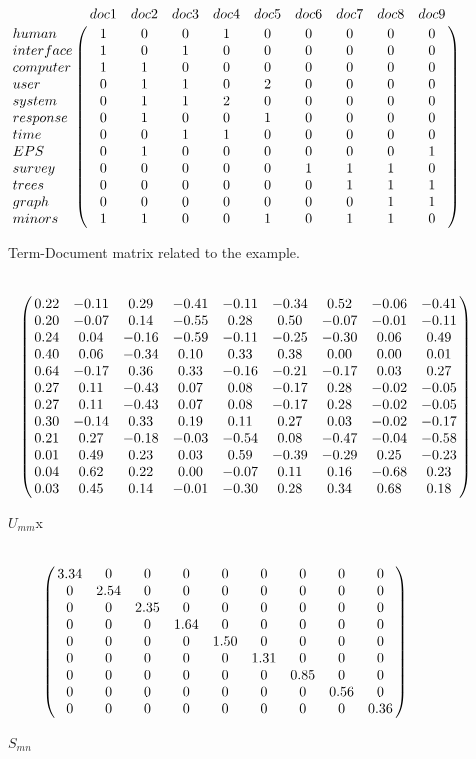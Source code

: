\begin{figure}[h!]
	\begin{equation} \nonumber
	\bordermatrix{~ & doc1 & doc2 & doc3 & doc4 & doc5 & doc6 & doc7 & doc8 & doc9 \cr	
		human	& 1 & 0 & 0 & 1 & 0 & 0 & 0 & 0 & 0 \cr
		interface	& 1 & 0 & 1 & 0 & 0 & 0 & 0 & 0 & 0 \cr
		computer	& 1 & 1 & 0 & 0 & 0 & 0 & 0 & 0 & 0 \cr    
		user 		& 0 & 1 & 1 & 0 & 2 & 0 & 0 & 0 & 0 \cr
		system 	& 0 & 1 & 1 & 2 & 0 & 0 & 0 & 0 & 0 \cr
		response	& 0 & 1 & 0 & 0 & 1 & 0 & 0 & 0 & 0 \cr
		time 		& 0 & 0 & 1 & 1 & 0 & 0 & 0 & 0 & 0 \cr
		EPS 		& 0 & 1 & 0 & 0 & 0 & 0 & 0 & 0 & 1 \cr
		survey	& 0 & 0 & 0 & 0 & 0 & 1 & 1 & 1 & 0 \cr
		trees 		& 0 & 0 & 0 & 0 & 0 & 0 & 1 & 1 & 1 \cr
		graph 		& 0 & 0 & 0 & 0 & 0 & 0 & 0 & 1 & 1 \cr
		minors		& 1 & 1 & 0 & 0 & 1 & 0 & 1 & 1 & 0 \cr	  }
	\end{equation}
	\caption{Term-Document matrix related to the example.}
	\label{fig:TDM}
\end{figure}

\begin{figure}[h!]
	\begin{equation} \nonumber
	\bordermatrix{ ~ \cr
		& 0.22 & -0.11 & 0.29 & -0.41 & -0.11 & -0.34 & 0.52 & -0.06 & -0.41 \cr
		& 0.20 & -0.07 & 0.14 & -0.55 & 0.28 & 0.50 & -0.07 & -0.01 & -0.11 \cr
		& 0.24 & 0.04 & -0.16 & -0.59 & -0.11 & -0.25 & -0.30 & 0.06 & 0.49 \cr
		& 0.40 & 0.06 & -0.34 & 0.10 & 0.33 & 0.38 & 0.00 & 0.00 & 0.01 \cr
		& 0.64 & -0.17 & 0.36 & 0.33 & -0.16 & -0.21 & -0.17 & 0.03 & 0.27 \cr
		& 0.27 & 0.11 & -0.43 & 0.07 & 0.08 & -0.17 & 0.28 & -0.02 & -0.05 \cr
		& 0.27 & 0.11 & -0.43 & 0.07 & 0.08 & -0.17 & 0.28 & -0.02 & -0.05 \cr
		& 0.30 & -0.14 & 0.33 & 0.19 & 0.11 & 0.27 & 0.03 & -0.02 & -0.17 \cr
		& 0.21 & 0.27 & -0.18 & -0.03 & -0.54 & 0.08 & -0.47 & -0.04 & -0.58 \cr
		& 0.01 & 0.49 & 0.23 & 0.03 & 0.59 & -0.39 & -0.29 & 0.25 & -0.23 \cr
		& 0.04 & 0.62 & 0.22 & 0.00 & -0.07 & 0.11 & 0.16 & -0.68 & 0.23 \cr
		& 0.03 & 0.45 & 0.14 & -0.01 & -0.30 & 0.28 & 0.34 & 0.68 & 0.18 \cr	  }
	\end{equation}
	\caption{$U_{mm}$x}
	\label{fig:TDM}
\end{figure}

\begin{figure}[h!]
	\begin{equation} \nonumber
	\bordermatrix{~  \cr	
		& 3.34 & 0 & 0 & 0 & 0 & 0 & 0 & 0 & 0 \cr
		& 0 & 2.54 & 0 & 0 & 0 & 0 & 0 & 0 & 0 \cr
		& 0 & 0 & 2.35 & 0 & 0 & 0 & 0 & 0 & 0 \cr
		& 0 & 0 & 0 & 1.64 & 0 & 0 & 0 & 0 & 0 \cr
		& 0 & 0 & 0 & 0 & 1.50 & 0 & 0 & 0 & 0 \cr
		& 0 & 0 & 0 & 0 & 0 & 1.31 & 0 & 0 & 0 \cr
		& 0 & 0 & 0 & 0 & 0 & 0 & 0.85 & 0 & 0 \cr
		& 0 & 0 & 0 & 0 & 0 & 0 & 0 & 0.56 & 0 \cr
		& 0 & 0 & 0 & 0 & 0 & 0 & 0 & 0 & 0.36 \cr
	  }
	\end{equation}
	\caption{ $S_{mn}$}
	\label{fig:TDM}
\end{figure}


